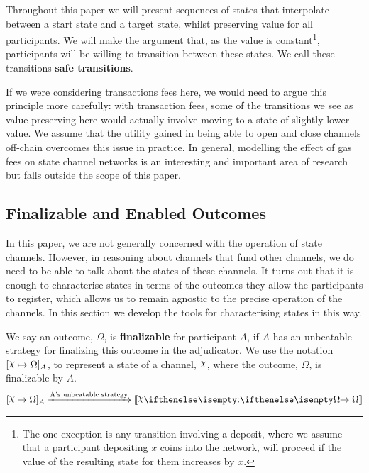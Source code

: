 \documentclass{article}
\begin{document}
Throughout this paper we will present sequences of states that interpolate between a start state and a target state, whilst preserving value for all participants.
We will make the argument that, as the value is constant\footnote{
The one exception is any transition involving a deposit, where we assume that a participant depositing
$x$ coins into the network, will proceed if the value of the resulting state for them increases by $x$.
}, participants will be willing to transition between these states.
We call these transitions \textbf{safe transitions}.

If we were considering transactions fees here, we would need to argue this principle more
carefully: with transaction fees, some of the transitions we see as value preserving here
would actually involve moving to a state of slightly lower value. 
We assume that the utility gained in being able to open and close channels off-chain overcomes
this issue in practice.
In general, modelling the effect of gas fees on state channel networks is an interesting and important area of research but falls outside the scope of this paper.

\subsection{Finalizable and Enabled Outcomes}

In this paper, we are not generally concerned with the operation of state channels.
However, in reasoning about channels that fund other channels, we do need to be able to talk about the states of these channels.
It turns out that it is enough to characterise states in terms of the outcomes they allow the participants to register, which allows us to remain agnostic to the precise operation of the channels.
In this section we develop the tools for characterising states in this way.

We say an outcome, $\Omega$, is \textbf{finalizable} for participant $A$, if $A$ has an unbeatable
strategy for finalizing this outcome in the adjudicator.
We use the notation $\finalizable{\rchi}{\Omega}{A}$, to represent a state of a channel, $\rchi$,
where the outcome, $\Omega$, is finalizable by $A$.
\begin{align}
  \finalizable{\rchi}{\Omega}{A} \xrightarrow{\text{A's unbeatable strategy}} \adj{\holds{\rchi}{}{\Omega}}
\end{align}
\end{document}
